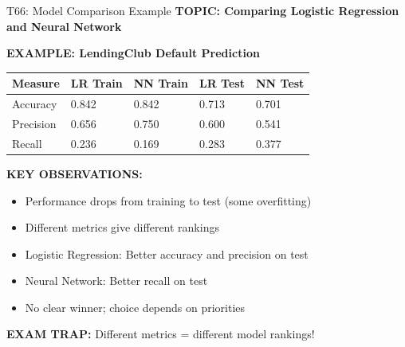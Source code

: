 \documentclass[8pt]{beamer}
\begin{document}
	\begin{frame}{T66: Model Comparison Example}
		\fontsize{6.5}{7.5}\selectfont
		\textbf{TOPIC: Comparing Logistic Regression and Neural Network}
		
		\vspace{0.1cm}
		\textbf{EXAMPLE: LendingClub Default Prediction}
		
		\begin{tabular}{|p{2.5cm}|p{2.5cm}|p{2.5cm}|p{2.5cm}|p{2.5cm}|}
			\hline
			\textbf{Measure} & \textbf{LR Train} & \textbf{NN Train} & \textbf{LR Test} & \textbf{NN Test} \\
			\hline
			Accuracy & 0.842 & 0.842 & 0.713 & 0.701 \\
			\hline
			Precision & 0.656 & 0.750 & 0.600 & 0.541 \\
			\hline
			Recall & 0.236 & 0.169 & 0.283 & 0.377 \\
			\hline
		\end{tabular}
		
		\vspace{0.1cm}
		\textbf{KEY OBSERVATIONS:}
		\begin{itemize}
			\item Performance drops from training to test (some overfitting)
			\item Different metrics give different rankings
			\item \textcolor{myblue}{Logistic Regression:} Better accuracy and precision on test
			\item \textcolor{myblue}{Neural Network:} Better recall on test
			\item No clear winner; choice depends on priorities
		\end{itemize}
		
		\textcolor{myred}{\textbf{EXAM TRAP:}} Different metrics = \textcolor{myblue}{different model rankings}!
	\end{frame}
	
\end{document}
